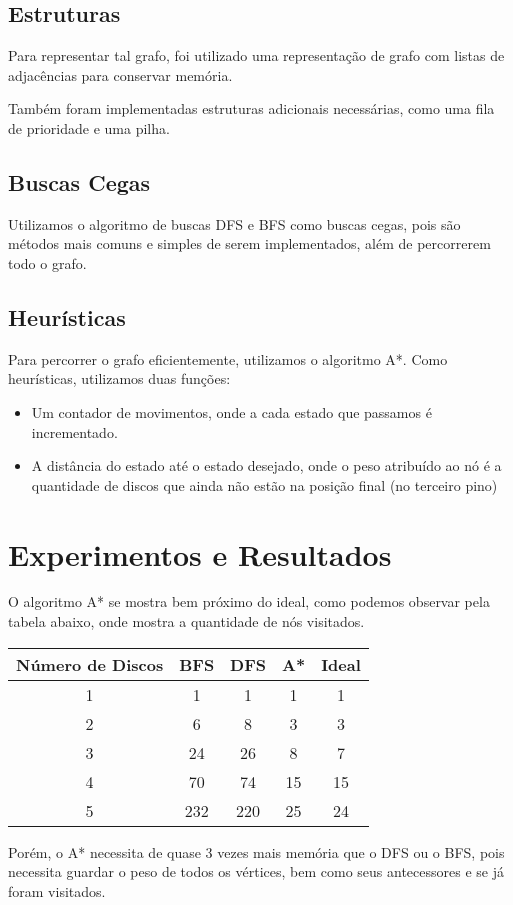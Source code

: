 \documentclass[10pt,a4paper]{article}
\begin{document}
\subsection{Estruturas}
Para representar tal grafo, foi utilizado uma representação de grafo com listas de adjacências para conservar memória.

Também foram implementadas estruturas adicionais necessárias, como uma fila de prioridade e uma pilha.

\subsection{Buscas Cegas}
Utilizamos o algoritmo de buscas DFS e BFS como buscas cegas, pois são métodos mais comuns e simples de serem implementados, além de percorrerem todo o grafo.

\subsection{Heurísticas}
Para percorrer o grafo eficientemente, utilizamos o algoritmo A*. Como heurísticas, utilizamos duas funções:
\begin{itemize}
\item Um contador de movimentos, onde a cada estado que passamos é incrementado.
\item A distância do estado até o estado desejado, onde o peso atribuído ao nó é a quantidade de discos que ainda não estão na posição final (no terceiro pino)
\end{itemize}
\section{Experimentos e Resultados}
O algoritmo A* se mostra bem próximo do ideal, como podemos observar pela tabela abaixo, onde mostra a quantidade de nós visitados.
\begin{center}
\begin{table}[H]
\begin{tabular}{|c|c|c|c|c|}
\textbf{Número de Discos} & \textbf{BFS} & \textbf{DFS} & \textbf{A*} & \textbf{Ideal} \\
\hline
1 & 1 & 1 & 1 & 1 \\
2 & 6 & 8 & 3 & 3 \\
3 & 24 & 26 & 8 & 7\\
4 & 70 & 74 & 15 & 15\\
5 & 232 & 220 & 25 & 24\\
\end{tabular}
\end{table}
\end{center}
Porém, o A* necessita de quase 3 vezes mais memória que o DFS ou o BFS, pois necessita guardar o peso de todos os vértices, bem como seus antecessores e se já foram visitados.
\end{document}
